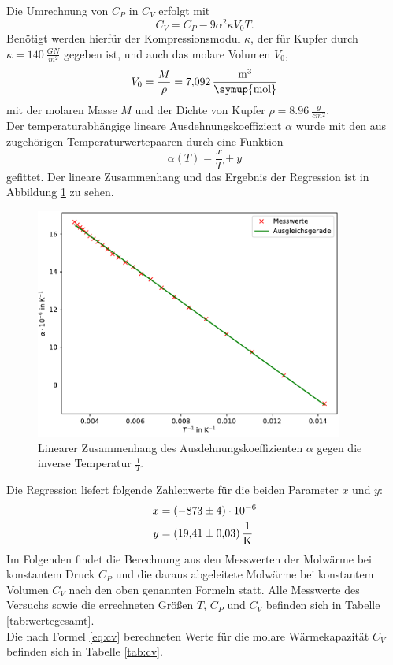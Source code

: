 Die Umrechnung von $C_P$ in $C_V$ erfolgt mit
\begin{equation}
  C_V = C_P-9\alpha ^2 \kappa V_0 T.
	\label{eq:cv}
\end{equation}
Benötigt werden hierfür der Kompressionsmodul $\kappa$, der für Kupfer durch $\kappa= \SI{140}{\frac{GN}{m^2}}$ gegeben ist, und auch das molare Volumen $V_0$,
\begin{equation}
	V_0=\frac{M}{\rho}=\SI{7,092}{\frac{m^3}{\symup{mol}}}
\end{equation}
mit der molaren Masse $M$ und der Dichte von Kupfer $\rho=\SI{8,96}{\frac{g}{cm^2}}$\cite{molaremassecu}.\\
Der temperaturabhängige lineare Ausdehnungskoeffizient $\alpha$ wurde mit den aus \cite{anleitung} zugehörigen Temperaturwertepaaren durch eine Funktion
\begin{equation}
	\alpha(T)=\frac{x}{T}+y
\end{equation}
gefittet. Der lineare Zusammenhang und das Ergebnis der Regression ist in Abbildung \ref{fig:alphaplot} zu sehen.
\clearpage
\begin{figure}[H]
  \centering
  \includegraphics[width=0.9\textwidth]{plots/alphaplot.pdf}
  \caption{Linearer Zusammenhang des Ausdehnungskoeffizienten $\alpha$ gegen die inverse Temperatur $\frac{1}{T}$.}
  \label{fig:alphaplot}
\end{figure}
\clearpage
Die Regression liefert folgende Zahlenwerte für die beiden Parameter $x$ und $y$:
\begin{align*}
	x &=(-873 \pm 4)\cdot 10^{-6}\\
	y &=\SI{19,41 \pm 0,03}{\frac{1}{K}}
\end{align*}
Im Folgenden findet die Berechnung aus den Messwerten der Molwärme bei konstantem Druck $C_P$ und die daraus abgeleitete Molwärme bei konstantem Volumen $C_V$
nach den oben genannten Formeln statt. Alle Messwerte des Versuchs sowie die errechneten Größen $T$, $C_P$ und $C_V$ befinden sich in Tabelle \ref{tab:wertegesamt}.\\
Die nach Formel \ref{eq:cv} berechneten Werte für die molare Wärmekapazität $C_V$ befinden sich in Tabelle \ref{tab:cv}.

